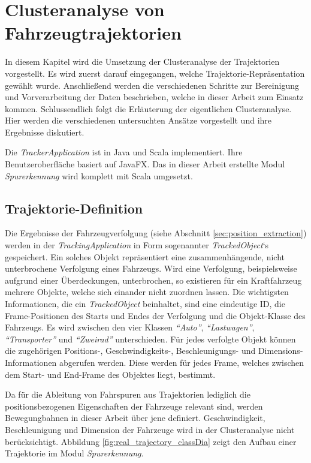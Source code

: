 
\chapter{Clusteranalyse von Fahrzeugtrajektorien}
\label{cha:realisation_clustering}

In diesem Kapitel wird die Umsetzung der Clusteranalyse der Trajektorien vorgestellt.
Es wird zuerst darauf eingegangen, welche Trajektorie-Repräsentation gewählt wurde. Anschließend
werden die verschiedenen Schritte zur Bereinigung und Vorverarbeitung der Daten beschrieben, welche
in dieser Arbeit zum Einsatz kommen. Schlussendlich folgt die Erläuterung der eigentlichen Clusteranalyse.
Hier werden die verschiedenen untersuchten Ansätze vorgestellt und ihre Ergebnisse diskutiert.

Die \textit{TrackerApplication} ist in Java und Scala implementiert. Ihre Benutzeroberfläche basiert
auf JavaFX. Das in dieser Arbeit erstellte Modul \textit{Spurerkennung} wird komplett mit Scala umgesetzt.

\section{Trajektorie-Definition}

Die Ergebnisse der Fahrzeugverfolgung (siehe Abschnitt \ref{sec:position_extraction}) werden
in der \textit{TrackingApplication} in Form sogenannter \textit{TrackedObject}`s gespeichert.
Ein solches Objekt repräsentiert eine zusammenhängende, nicht unterbrochene Verfolgung eines Fahrzeugs.
Wird eine Verfolgung, beispielsweise aufgrund einer Überdeckungen, unterbrochen, so existieren für ein
Kraftfahrzeug mehrere Objekte, welche sich einander nicht zuordnen lassen.
Die wichtigsten Informationen, die ein \textit{TrackedObject} beinhaltet, sind eine eindeutige ID,
die Frame-Positionen des Starts und Endes der Verfolgung und die Objekt-Klasse des Fahrzeugs. Es wird
zwischen den vier Klassen \textit{``Auto''}, \textit{``Lastwagen''}, \textit{``Transporter''}
und \textit{``Zweirad''} unterschieden.
Für jedes verfolgte Objekt können die zugehörigen Positions-, Geschwindigkeits-, Beschleunigungs-
und Dimensions-Informationen abgerufen werden. Diese werden für jedes Frame, welches zwischen dem Start-
und End-Frame des Objektes liegt, bestimmt.

Da für die Ableitung von Fahrspuren aus Trajektorien lediglich die positionsbezogenen Eigenschaften
der Fahrzeuge relevant sind, werden Bewegungbahnen in dieser Arbeit über jene definiert.
Geschwindigkeit, Beschleunigung und Dimension der Fahrzeuge wird in der Clusteranalyse nicht berücksichtigt.
Abbildung \ref{fig:real_trajectory_classDia} zeigt den Aufbau einer Trajektorie im Modul \textit{Spurerkennung}.

